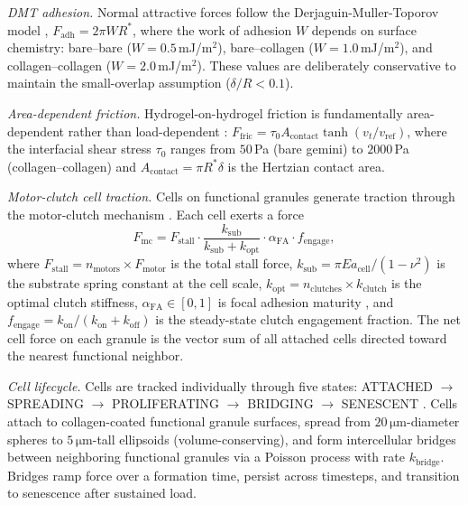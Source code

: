 \documentclass[9pt,twocolumn,twoside]{pnas-new}
\newcommand{\um}{\,\si{\micro\metre}}
\begin{document}
\textit{DMT adhesion.}
Normal attractive forces follow the Derjaguin-Muller-Toporov model
\cite{Derjaguin1975}, $F_\mathrm{adh} = 2\pi W R^{*}$, where the work of
adhesion $W$ depends on surface chemistry: bare--bare ($W = 0.5$\,mJ/m$^2$),
bare--collagen ($W = 1.0$\,mJ/m$^2$), and collagen--collagen ($W =
2.0$\,mJ/m$^2$). These values are deliberately conservative to maintain
the small-overlap assumption ($\delta/R < 0.1$).

\textit{Area-dependent friction.}
Hydrogel-on-hydrogel friction is fundamentally area-dependent rather than
load-dependent \cite{Gong2006,Pitenis2014,Uruena2018}: $F_\mathrm{fric} =
\tau_0 A_\mathrm{contact} \tanh(v_t / v_\mathrm{ref})$, where the
interfacial shear stress $\tau_0$ ranges from $50$\,Pa (bare gemini) to
$2000$\,Pa (collagen--collagen) and $A_\mathrm{contact} = \pi R^{*} \delta$
is the Hertzian contact area.

\textit{Motor-clutch cell traction.}
Cells on functional granules generate traction through the motor-clutch
mechanism \cite{Chan2008,Bangasser2013}. Each cell exerts a force
%
\begin{equation}\label{eq:mc}
  F_\mathrm{mc} = F_\mathrm{stall} \cdot
  \frac{k_\mathrm{sub}}{k_\mathrm{sub} + k_\mathrm{opt}} \cdot
  \alpha_\mathrm{FA} \cdot f_\mathrm{engage},
\end{equation}
%
where $F_\mathrm{stall} = n_\mathrm{motors} \times F_\mathrm{motor}$ is the
total stall force, $k_\mathrm{sub} = \pi E a_\mathrm{cell} / (1 - \nu^2)$
is the substrate spring constant at the cell scale, $k_\mathrm{opt} =
n_\mathrm{clutches} \times k_\mathrm{clutch}$ is the optimal clutch stiffness,
$\alpha_\mathrm{FA} \in [0,1]$ is focal adhesion maturity
\cite{Geiger2009}, and $f_\mathrm{engage} = k_\mathrm{on}/(k_\mathrm{on} +
k_\mathrm{off})$ is the steady-state clutch engagement fraction. The net
cell force on each granule is the vector sum of all attached cells directed
toward the nearest functional neighbor.

\textit{Cell lifecycle.}
Cells are tracked individually through five states: ATTACHED $\to$ SPREADING
$\to$ PROLIFERATING $\to$ BRIDGING $\to$ SENESCENT \cite{Engler2006}. Cells
attach to collagen-coated functional granule surfaces, spread from
$20\um$-diameter spheres to $5\um$-tall ellipsoids (volume-conserving), and
form intercellular bridges between neighboring functional granules via a
Poisson process with rate $k_\mathrm{bridge}$. Bridges ramp force over a
formation time, persist across timesteps, and transition to senescence after
sustained load.
\end{document}

